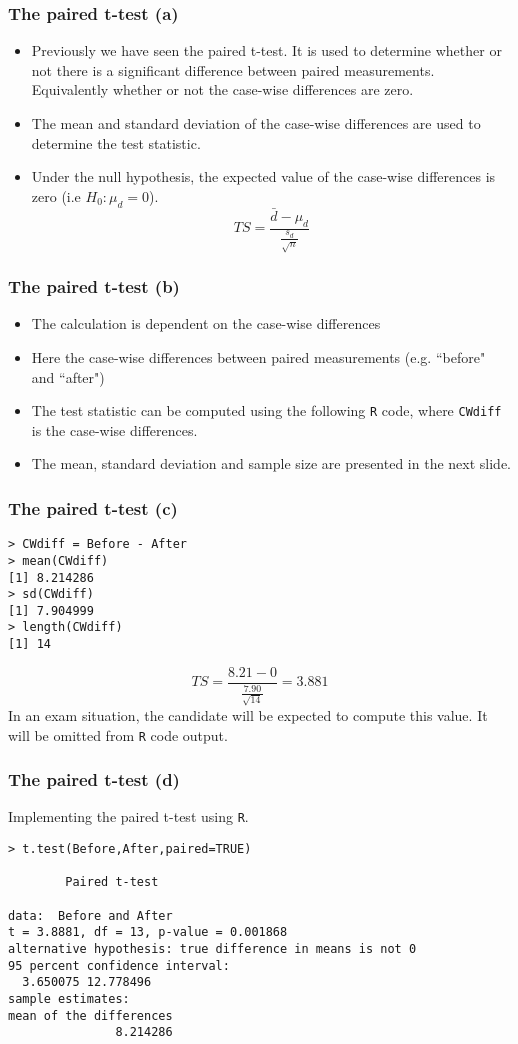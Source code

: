 \documentclass[a4]{beamer}
\begin{document}
\begin{frame}
\frametitle{The paired t-test (a)}

\begin{itemize}
\item Previously we have seen the paired t-test. It is used to determine whether or
not there is a significant difference between paired measurements. Equivalently whether or not
the case-wise differences are zero.
\item The mean and standard deviation of the case-wise differences are used to determine the test statistic.
\item Under the null hypothesis, the expected value of the case-wise differences is zero (i.e $H_0 : \mu_d = 0$).
\[ TS = \frac{\bar{d} - \mu_d}{\frac{s_d}{\sqrt{n}}} \]
\end{itemize}
\end{frame}


\begin{frame}[fragile]
\frametitle{The paired t-test (b)}
\begin{itemize}
\item The calculation is dependent on the case-wise differences
\item Here the case-wise differences between paired measurements (e.g. ``before" and ``after")
\item The test statistic can be computed using the following \texttt{R} code, where \texttt{CWdiff} is the case-wise differences. \item The mean, standard deviation and sample size are presented in the next slide.
\end{itemize}
\end{frame}

\begin{frame}[fragile]
\frametitle{The paired t-test (c)}
\begin{verbatim}
> CWdiff = Before - After
> mean(CWdiff)
[1] 8.214286
> sd(CWdiff)
[1] 7.904999
> length(CWdiff)
[1] 14
\end{verbatim}

\[ TS = \frac{8.21 - 0}{\frac{7.90}{\sqrt{14}}} = 3.881 \]
In an exam situation, the candidate will be expected to compute this value. It will be omitted from \texttt{R} code output.
\end{frame}

\begin{frame}[fragile]
\frametitle{The paired t-test (d)}
Implementing the paired t-test using \texttt{R}.
\begin{verbatim}
> t.test(Before,After,paired=TRUE)

        Paired t-test

data:  Before and After
t = 3.8881, df = 13, p-value = 0.001868
alternative hypothesis: true difference in means is not 0
95 percent confidence interval:
  3.650075 12.778496
sample estimates:
mean of the differences
               8.214286

\end{verbatim}
\end{frame}
\end{document}
